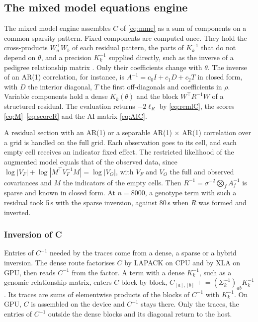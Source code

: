 \documentclass[article,nojss]{jss}
\renewcommand{\pkg}[1]{#1}
\begin{document}
\subsection{The mixed model equations engine}\label{sec:mme}

The mixed model engine assembles $C$ of \eqref{eq:mme} as a sum of components
on a common sparsity pattern. Fixed components are computed once. They hold
the cross-products $W_a^\top W_b$ of each residual pattern, the parts of
$K_k^{-1}$ that do not depend on $\theta$, and a precision $K_k^{-1}$
supplied directly, such as the inverse of a pedigree relationship matrix
\citep{henderson1976}. Only their coefficients change with $\theta$. The
inverse of an AR(1) correlation, for instance, is $A^{-1} = c_0 I + c_1 D +
c_2 T$ in closed form, with $D$ the interior diagonal, $T$ the first
off-diagonals and coefficients in $\rho$. Variable components hold a dense
$K_k(\theta)$ and the block $W^\top R^{-1} W$ of a structured residual. The
evaluation returns $-2\ell_R$ by \eqref{eq:remlC}, the scores
\eqref{eq:M}--\eqref{eq:scoreR} and the AI matrix \eqref{eq:AIC}.

A residual section with an AR(1) or a separable AR(1) $\times$ AR(1)
correlation over a grid is handled on the full grid. Each observation goes to
its cell, and each empty cell receives an indicator fixed effect. The
restricted likelihood of the augmented model equals that of the observed data,
since $\log|V_F| + \log|M^\top V_F^{-1} M| = \log|V_O|$, with $V_F$ and
$V_O$ the full and observed covariances and $M$ the indicators of the empty
cells. Then $R^{-1} = \sigma^{-2} \bigotimes_f A_f^{-1}$ is
sparse and known in closed form. At $n = 8000$, a genotype term with such a
residual took 5\,s with the sparse inversion, against 80\,s when $R$ was formed
and inverted.

\subsubsection{Inversion of C}

Entries of $C^{-1}$ needed by the traces come from a dense, a sparse or a
hybrid inversion. The dense
route factorises $C$ by \pkg{LAPACK} on CPU and by \pkg{XLA} on GPU, then reads
$C^{-1}$ from the factor. A term with a dense $K_k^{-1}$, such as a genomic
relationship matrix, enters $C$ block by block, $C_{[a],[b]} \mathrel{+}=
(\Sigma_k^{-1})_{ab} K_k^{-1}$. Its traces are sums of elementwise products of
the blocks of $C^{-1}$ with $K_k^{-1}$. On GPU, $C$ is assembled on the device
and $C^{-1}$ stays there. Only the traces, the entries of $C^{-1}$ outside the
dense blocks and its diagonal return to the host.
\end{document}
